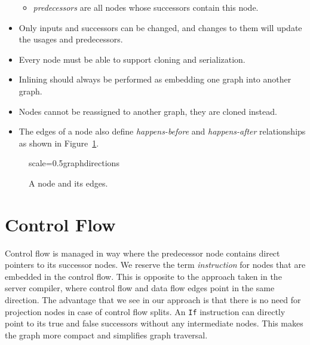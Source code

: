 \documentclass[twocolumn]{svjour3}
\begin{document}
\begin{itemize}
\begin{itemize}
        \item \emph{predecessors} are all nodes whose successors contain this node.
    \end{itemize}
    \item Only inputs and successors can be changed, and changes to them will update the usages and predecessors.
    \item Every node must be able to support cloning and serialization.
    \item Inlining should always be performed as embedding one graph into another graph.
    \item Nodes cannot be reassigned to another graph, they are cloned instead.
    \item The edges of a node also define \textit{happens-before} and \textit{happens-after} relationships as shown in Figure~\ref{fig:directions}.
\end{itemize}

\begin{figure}[h]
  \centering
\begin{digraphenv}{scale=0.5}{graphdirections}
\end{digraphenv}
  \caption{A node and its edges.}
  \label{fig:directions}
\end{figure}

\section{Control Flow}

Control flow is managed in way where the predecessor node contains direct pointers to its successor nodes.
We reserve the term \textit{instruction} for nodes that are embedded in the control flow.
This is opposite to the approach taken in the server compiler, where control flow and data flow edges point in the same direction.
The advantage that we see in our approach is that there is no need for projection nodes in case of control flow splits.
An \texttt{If} instruction can directly point to its true and false successors without any intermediate nodes.
This makes the graph more compact and simplifies graph traversal.
\end{document}
